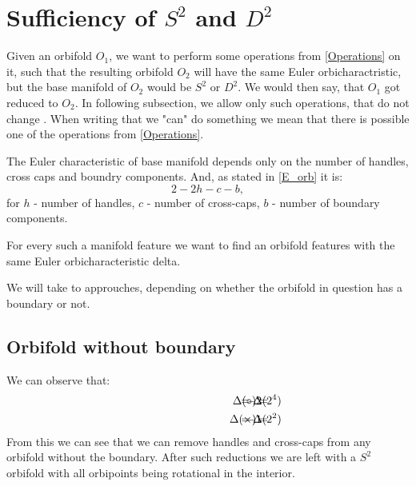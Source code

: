 \section{Sufficiency of $S^2$ and $D^2$}\label{sufficiency of D2 and S2}

Given an orbifold $O_1$, we want to perform some operations from \ref{Operations} on it, 
such that the resulting orbifold 
$O_2$ will have the same Euler orbicharactristic, but the base manifold of $O_2$ would 
be $S^2$ or $D^2$. We would then say, that $O_1$ got reduced to $O_2$.
In following subsection, we allow only such operations, that do not 
change \Eoc. When writing that we "can" do something we mean that there is 
possible one of the operations from \ref{Operations}.  %

The Euler characteristic of base manifold depends only on the number of handles, cross caps 
and boundry components. And, as stated in \ref{E_orb} it is: 
\begin{equation}
2-2h-c-b,
\end{equation}
for $h$ - number of handles, $c$ - number of cross-caps, $b$ - number of boundary components. 

For every such a manifold feature we want to find an orbifold features with the same 
Euler orbicharacteristic delta. 

We will take to approuches, depending on whether the orbifold in question has a boundary or not.

\subsection{Orbifold without boundary}
We can observe that:
\begin{align}
\hspace{3cm}\Delta(\circ) =& \hspace{-1cm} &-2& \hspace{-1cm} &= \Delta(2^4) \\
\hspace{3cm}\Delta(\times) =& \hspace{-1cm} &-1& \hspace{-1cm} &= \Delta(2^2)
\end{align}
From this we can see that we can remove handles and cross-caps from any orbifold without 
the boundary. 
After such reductions we are left with a $S^2$ orbifold with all orbipoints being rotational 
in the interior.

